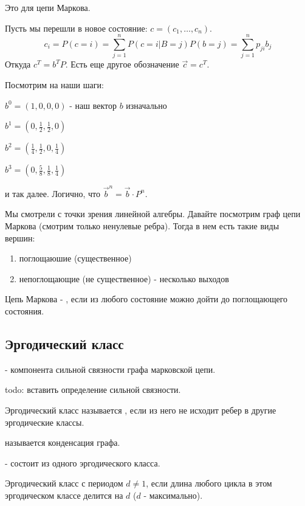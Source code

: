 Это  для цепи Маркова.

Пусть мы перешли в новое состояние: $c = (c_1,\ldots,c_n)$.
$$c_i = P(c = i) = \sum\limits_{j=1}^n P(c=i|B=j)P(b=j)=\sum\limits_{j=1}^n p_{ji}b_j$$
Откуда $c^T=b^TP$. Есть еще другое обозначение $\overrightarrow{c} = c^T$.

Посмотрим на наши шаги:

$b^0 = (1,0,0,0)$ - наш вектор $b$ изначально

$b^1 = (0,\frac{1}{2},\frac{1}{2},0)$

$b^2 = (\frac{1}{4},\frac{1}{2},0,\frac{1}{4})$

$b^3 = (0,\frac{5}{8},\frac{1}{8},\frac{1}{4})$

и так далее. Логично, что $\overrightarrow{b}^n = \overrightarrow{b} \cdot P^n$.

Мы смотрели с точки зрения линейной алгебры. Давайте посмотрим граф цепи Маркова (смотрим только ненулевые ребра). Тогда в нем есть такие виды вершин:
\begin{enumerate}
    \item поглощаюшие (существенное)
    \item непоглощающие (не существенное) - несколько выходов
\end{enumerate}

Цепь Маркова - , если из любого состояние можно дойти до поглощающего состояния.

\subsection{Эргодический класс}

 - компонента сильной связности графа марковской цепи.

todo: вставить определение сильной связности.

Эргодический класс называется , если из него не исходит ребер в другие эргодические классы.

 называется конденсация графа.

 - состоит из одного эргодического класса.

Эргодический класс  с периодом $d\neq 1$, если длина любого цикла в этом эргодическом классе делится на $d$ ($d$ - максимально).


